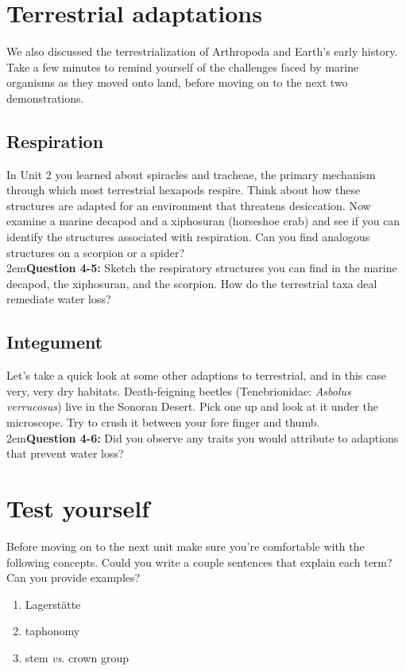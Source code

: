 \documentclass[letterpaper, 11pt]{article}
\begin{document}
\section{Terrestrial adaptations}
We also discussed the terrestrialization of Arthropoda and Earth's early history. Take a few minutes to remind yourself of the challenges faced by marine organisms as they moved onto land, before moving on to the next two demonstrations.

\subsection{Respiration}
In Unit 2 you learned about spiracles and tracheae, the primary mechanism through which most terrestrial hexapods respire. Think about how these structures are adapted for an environment that threatens desiccation. Now examine a marine decapod and a xiphosuran (horseshoe crab) and see if you can identify the structures associated with respiration. Can you find analogous structures on a scorpion or a spider?\\

\hangindent2em\textbf{Question 4-5:} Sketch the respiratory structures you can find in the marine decapod, the xiphosuran, and the scorpion. How do the terrestrial taxa deal remediate water loss? 

\subsection{Integument}
Let's take a quick look at some other adaptions to terrestrial, and in this case very, very dry habitats. Death-feigning beetles (Tenebrionidae: \textit{Asbolus verrucosus}) live in the Sonoran Desert. Pick one up and look at it under the microscope. Try to crush it between your fore finger and thumb.\\

\hangindent2em\textbf{Question 4-6:} Did you observe any traits you would attribute to adaptions that prevent water loss?


\section*{Test yourself}
Before moving on to the next unit make sure you're comfortable with the following concepts. Could you write a couple sentences that explain each term? Can you provide examples?

\begin{enumerate} 
\item{Lagerst{\"a}tte} 
\item{taphonomy}  
\item {stem \textit{vs}. crown group}
\end{enumerate}
\end{document}
